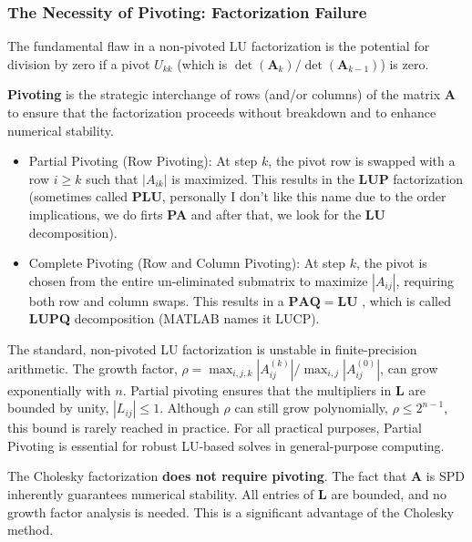 \subsubsection{The Necessity of Pivoting: Factorization Failure}

The fundamental flaw in a non-pivoted LU factorization is the potential for division by zero if a pivot $U_{kk}$ (which is $\det(\mathbf{A}_k) / \det(\mathbf{A}_{k-1})$) is zero.

\begin{definition}[Pivoting]
\textbf{Pivoting} is the strategic interchange of rows (and/or columns) of the matrix $\mathbf{A}$ to ensure that the factorization proceeds without breakdown and to enhance numerical stability.
\begin{itemize}
    \item Partial Pivoting (Row Pivoting): At step $k$, the pivot row is swapped with a row $i \ge k$ such that $|A_{ik}|$ is maximized. This results in the $\mathbf{LUP}$ factorization (sometimes called \textbf{PLU}, personally I don't like this name due to the order implications, we do firts \textbf{PA} and after that, we look for the \textbf{LU} decomposition).
    \item Complete Pivoting (Row and Column Pivoting): At step $k$, the pivot is chosen from the entire un-eliminated submatrix to maximize $|A_{ij}|$, requiring both row and column swaps. This results in a $\mathbf{P}\mathbf{A}\mathbf{Q} = \mathbf{L}\mathbf{U}$ , which is called \textbf{LUPQ} decomposition (MATLAB names it LUCP).
\end{itemize}
\end{definition}

\begin{proposition}[Stability of LU]
The standard, non-pivoted LU factorization is unstable in finite-precision arithmetic. The growth factor, $\rho = \max_{i,j,k} |A_{ij}^{(k)}| / \max_{i,j} |A_{ij}^{(0)}|$, can grow exponentially with $n$.
Partial pivoting ensures that the multipliers in $\mathbf{L}$ are bounded by unity, $|L_{ij}| \le 1$. Although $\rho$ can still grow polynomially, $\rho \le 2^{n-1}$, this bound is rarely reached in practice. For all practical purposes, Partial Pivoting is essential for robust LU-based solves in general-purpose computing.
\end{proposition}

\begin{remark}
The Cholesky factorization \textbf{does not require pivoting}. The fact that $\mathbf{A}$ is SPD inherently guarantees numerical stability. All entries of $\mathbf{L}$ are bounded, and no growth factor analysis is needed. This is a significant advantage of the Cholesky method.
\end{remark}

